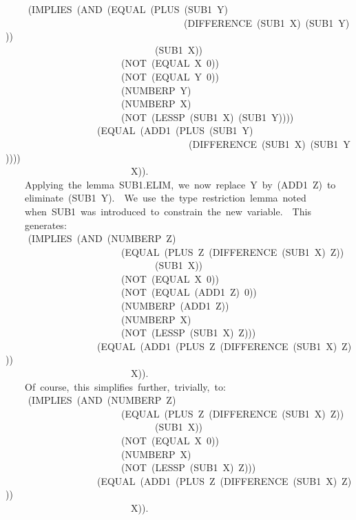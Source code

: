 \documentclass[10pt]{book}
\newenvironment{pubasis}{\begin{flushleft}}{\end{flushleft}}
\begin{document}
\begin{pubasis}
~~	~~(IMPLIES~(AND~(EQUAL~(PLUS~(SUB1~Y)\\
~~~~~~~~~~~~~~~~~~~~~~~~~~~~~~~~~~~~~(DIFFERENCE~(SUB1~X)~(SUB1~Y)))\\
~~~~~~~~~~~~~~~~~~~~~~~~~~~~~~~(SUB1~X))\\
~~~~~~~~~~~~~~~~~~~~~~~~(NOT~(EQUAL~X~0))\\
~~~~~~~~~~~~~~~~~~~~~~~~(NOT~(EQUAL~Y~0))\\
~~~~~~~~~~~~~~~~~~~~~~~~(NUMBERP~Y)\\
~~~~~~~~~~~~~~~~~~~~~~~~(NUMBERP~X)\\
~~~~~~~~~~~~~~~~~~~~~~~~(NOT~(LESSP~(SUB1~X)~(SUB1~Y))))\\
~~~~~~~~~~~~~~~~~~~(EQUAL~(ADD1~(PLUS~(SUB1~Y)\\
~~~~~~~~~~~~~~~~~~~~~~~~~~~~~~~~~~~~~~(DIFFERENCE~(SUB1~X)~(SUB1~Y))))\\
~~~~~~~~~~~~~~~~~~~~~~~~~~X)).\\

~~~~Applying~the~lemma~SUB1.ELIM,~we~now~replace~Y~by~(ADD1~Z)~to\\
~~~~eliminate~(SUB1~Y).~~We~use~the~type~restriction~lemma~noted\\
~~~~when~SUB1~was~introduced~to~constrain~the~new~variable.~~This\\
~~~~generates:\\

~~	~~(IMPLIES~(AND~(NUMBERP~Z)\\
~~~~~~~~~~~~~~~~~~~~~~~~(EQUAL~(PLUS~Z~(DIFFERENCE~(SUB1~X)~Z))\\
~~~~~~~~~~~~~~~~~~~~~~~~~~~~~~~(SUB1~X))\\
~~~~~~~~~~~~~~~~~~~~~~~~(NOT~(EQUAL~X~0))\\
~~~~~~~~~~~~~~~~~~~~~~~~(NOT~(EQUAL~(ADD1~Z)~0))\\
~~~~~~~~~~~~~~~~~~~~~~~~(NUMBERP~(ADD1~Z))\\
~~~~~~~~~~~~~~~~~~~~~~~~(NUMBERP~X)\\
~~~~~~~~~~~~~~~~~~~~~~~~(NOT~(LESSP~(SUB1~X)~Z)))\\
~~~~~~~~~~~~~~~~~~~(EQUAL~(ADD1~(PLUS~Z~(DIFFERENCE~(SUB1~X)~Z)))\\
~~~~~~~~~~~~~~~~~~~~~~~~~~X)).\\

~~~~Of~course,~this~simplifies~further,~trivially,~to:\\

~~	~~(IMPLIES~(AND~(NUMBERP~Z)\\
~~~~~~~~~~~~~~~~~~~~~~~~(EQUAL~(PLUS~Z~(DIFFERENCE~(SUB1~X)~Z))\\
~~~~~~~~~~~~~~~~~~~~~~~~~~~~~~~(SUB1~X))\\
~~~~~~~~~~~~~~~~~~~~~~~~(NOT~(EQUAL~X~0))\\
~~~~~~~~~~~~~~~~~~~~~~~~(NUMBERP~X)\\
~~~~~~~~~~~~~~~~~~~~~~~~(NOT~(LESSP~(SUB1~X)~Z)))\\
~~~~~~~~~~~~~~~~~~~(EQUAL~(ADD1~(PLUS~Z~(DIFFERENCE~(SUB1~X)~Z)))\\
~~~~~~~~~~~~~~~~~~~~~~~~~~X)).\\


\end{pubasis}
\end{document}
